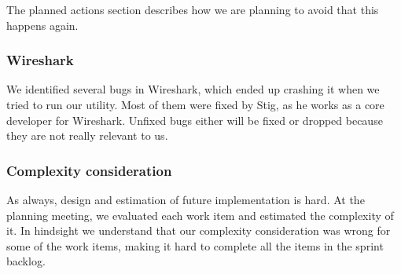 The planned actions section describes how we are planning to avoid that this happens again. 

\subsubsection{Wireshark} 
We identified several bugs in Wireshark, which ended up crashing it when we tried to run our utility. Most of them were fixed by Stig, as he works as a core developer for Wireshark. Unfixed bugs either will be fixed or dropped because they are not really relevant to us.

\subsubsection{Complexity consideration}
As always, design and estimation of future implementation is hard. At the planning meeting, we evaluated each work item and estimated the complexity of it. In hindsight we understand that our complexity consideration was wrong for some of the work items, making it hard to complete all the items in the sprint backlog. 































